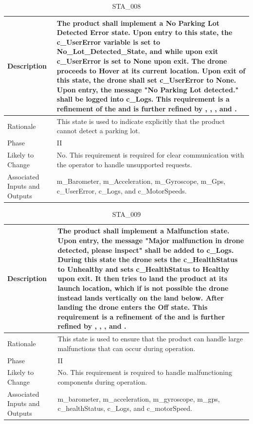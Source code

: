 \documentclass{article}
\begin{document}
\begin{table}[!h]
\begin{center}
\caption {STA\_008} 
\label{STA_008}
\begin{tabular}{ | m{3cm} | m{11cm} | }
\hline
Description & The product shall implement a No Parking Lot Detected Error state. Upon entry to this state, the c\_UserError variable is set to No_Lot_Detected_State, and while upon exit c\_UserError is set to None upon exit. The drone proceeds to Hover at its current location. Upon exit of this state, the drone shall set c\_UserError to None. Upon entry, the message "No Parking Lot detected." shall be logged into c\_Logs. This requirement is a refinement of the \nameref{No Parking Lot Detected Error State} and is further refined by \nameref{PERF_007}, \nameref{SAFE_001}, \nameref{SAFE_003}, and \nameref{USE_003}. \\
\hline
Rationale & This state is used to indicate explicitly that the product cannot detect a parking lot. \\
\hline
Phase & II \\
\hline
Likely to Change & No. This requirement is required for clear communication with the operator to handle unsupported requests. \\
\hline
Associated Inputs and Outputs & m\_Barometer, m\_Acceleration, m\_Gyroscope, m\_Gps, c\_UserError, c\_Logs, and c\_MotorSpeeds. \\
\hline
\end{tabular}
\end{center}
\end{table}

\begin{table}[!h]
\begin{center}
\caption {STA\_009} 
\label{STA_009}
\begin{tabular}{ | m{3cm} | m{11cm} | }
\hline
Description & The product shall implement a Malfunction state. Upon entry, the message "Major malfunction in drone detected, please inspect" shall be added to c\_Logs. During this state the drone sets the c\_HealthStatus to Unhealthy and sets c\_HealthStatus to Healthy upon exit. It then tries to land the product at its launch location, which if is not possible the drone instead lands vertically on the land below. After landing the drone enters the Off state. This requirement is a refinement of the \nameref{Malfunction State} and is further refined by \nameref{PERF_007}, \nameref{SAFE_001}, \nameref{SAFE_003}, and \nameref{USE_003}. \\
\hline
Rationale & This state is used to ensure that the product can handle large malfunctions that can occur during operation. \\
\hline
Phase & II \\
\hline
Likely to Change & No. This requirement is required to handle malfunctioning components during operation. \\
\hline
Associated Inputs and Outputs & m\_barometer, m\_acceleration, m\_gyroscope, m\_gps, c\_healthStatus, c\_Logs, and c\_motorSpeed. \\
\hline
\end{tabular}
\end{center}
\end{table}
\end{document}
